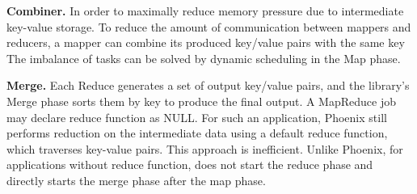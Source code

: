 
%
{\bf Combiner.}
In order to maximally reduce memory pressure due to intermediate key-value
storage.
To reduce the amount of communication between mappers and reducers, a mapper
can combine its produced key/value pairs with the same key
The imbalance of tasks can be solved by dynamic scheduling in the Map phase. 

{\bf Merge.}
Each Reduce generates a set of output key/value
pairs, and the library’s Merge phase sorts them by key to
produce the final output. 
A MapReduce job may declare reduce function as NULL. 
For such an application, 
Phoenix still performs reduction on the intermediate data using a default reduce function, 
which traverses key-value pairs. 
This approach is inefficient. 
Unlike Phoenix, for applications without reduce function, 
\myds does not start the reduce phase and directly starts the merge phase after the map phase.


